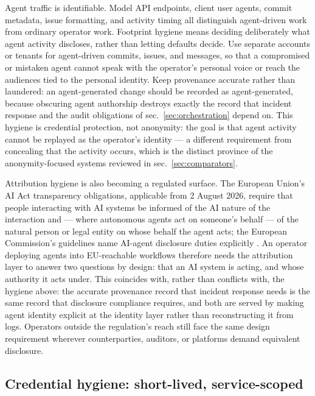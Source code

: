 \documentclass[
  english,
  9pt,
]{extarticle}
\begin{document}
Agent traffic is identifiable. Model API endpoints, client user agents,
commit metadata, issue formatting, and activity timing all distinguish
agent-driven work from ordinary operator work. Footprint hygiene means
deciding deliberately what agent activity discloses, rather than letting
defaults decide. Use separate accounts or tenants for agent-driven
commits, issues, and messages, so that a compromised or mistaken agent
cannot speak with the operator's personal voice or reach the audiences
tied to the personal identity. Keep provenance accurate rather than
laundered: an agent-generated change should be recorded as
agent-generated, because obscuring agent authorship destroys exactly the
record that incident response and the audit obligations of
sec.~\ref{sec:orchestration} depend on. This hygiene is credential
protection, not anonymity: the goal is that agent activity cannot be
replayed as the operator's identity --- a different requirement from
concealing that the activity occurs, which is the distinct province of
the anonymity-focused systems reviewed in sec.~\ref{sec:comparators}.

Attribution hygiene is also becoming a regulated surface. The European
Union's AI Act transparency obligations, applicable from 2 August 2026,
require that people interacting with AI systems be informed of the AI
nature of the interaction and --- where autonomous agents act on
someone's behalf --- of the natural person or legal entity on whose
behalf the agent acts; the European Commission's guidelines name
AI-agent disclosure duties explicitly \citep{eu_ai_act_transparency}. An
operator deploying agents into EU-reachable workflows therefore needs
the attribution layer to answer two questions by design: that an AI
system is acting, and whose authority it acts under. This coincides
with, rather than conflicts with, the hygiene above: the accurate
provenance record that incident response needs is the same record that
disclosure compliance requires, and both are served by making agent
identity explicit at the identity layer rather than reconstructing it
from logs. Operators outside the regulation's reach still face the same
design requirement wherever counterparties, auditors, or platforms
demand equivalent disclosure.

\subsection{Credential hygiene: short-lived,
service-scoped}\label{credential-hygiene-short-lived-service-scoped}
\end{document}
